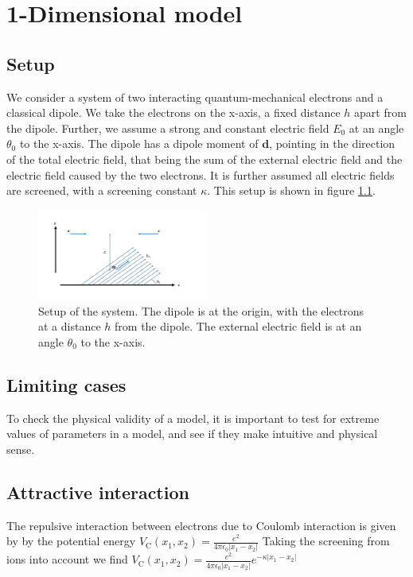 \chapter{1-Dimensional model}
\label{chapter:1-Dimensional}


\section{Setup}
We consider a system of two interacting quantum-mechanical electrons and a classical dipole. We take the electrons on the x-axis, a fixed distance $h$ apart from the dipole. Further, we assume a strong and constant electric field $E_0$ at an angle $\theta_0$ to the x-axis. The dipole has a dipole moment of $\mathbf{d}$, pointing in the direction of the total electric field, that being the sum of the external electric field and the electric field caused by the two electrons. It is further assumed all electric fields are screened, with a screening constant $\kappa$. This setup is shown in figure \ref{fig:setup}.

\begin{figure}[h]
    \centering
    \includegraphics[width=0.5\textwidth]{figures/setup.png}
    \caption{Setup of the system. The dipole is at the origin, with the electrons at a distance $h$ from the dipole. The external electric field is at an angle $\theta_0$ to the x-axis.}
    \label{fig:setup}
\end{figure}

\section{Limiting cases}
To check the physical validity of a model, it is important to test for extreme values of parameters in a model, and see if they make intuitive and physical sense. 


\section{Attractive interaction}
The repulsive interaction between electrons due to Coulomb interaction is given by by the potential energy $V_\text{C}(x_1, x_2) = \frac{e^2}{4 \pi \epsilon_0 |x_1-x_2|}$ Taking the screening from ions into account we find $V_\text{C}(x_1, x_2) = \frac{e^2}{4 \pi \epsilon_0 |x_1-x_2|}e^{-\kappa|x_1-x_2|}$



